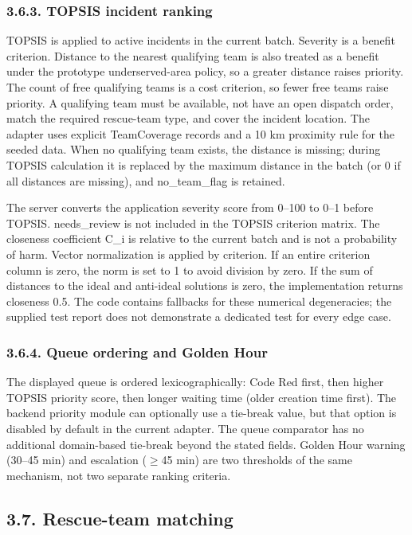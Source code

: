 \documentclass[pdflatex,sn-mathphys-ay]{sn-jnl}
\begin{document}
\subsubsection*{3.6.3. TOPSIS incident ranking}

TOPSIS is applied to active incidents in the current batch. Severity is a benefit criterion. Distance to the nearest qualifying team is also treated as a benefit under the prototype underserved-area policy, so a greater distance raises priority. The count of free qualifying teams is a cost criterion, so fewer free teams raise priority. A qualifying team must be available, not have an open dispatch order, match the required rescue-team type, and cover the incident location. The adapter uses explicit TeamCoverage records and a 10 km proximity rule for the seeded data. When no qualifying team exists, the distance is missing; during TOPSIS calculation it is replaced by the maximum distance in the batch (or 0 if all distances are missing), and no\_team\_flag is retained.

The server converts the application severity score from 0--100 to 0--1 before TOPSIS. needs\_review is not included in the TOPSIS criterion matrix. The closeness coefficient C\_i is relative to the current batch and is not a probability of harm. Vector normalization is applied by criterion. If an entire criterion column is zero, the norm is set to 1 to avoid division by zero. If the sum of distances to the ideal and anti-ideal solutions is zero, the implementation returns closeness 0.5. The code contains fallbacks for these numerical degeneracies; the supplied test report does not demonstrate a dedicated test for every edge case.

\subsubsection*{3.6.4. Queue ordering and Golden Hour}

The displayed queue is ordered lexicographically: Code Red first, then higher TOPSIS priority score, then longer waiting time (older creation time first). The backend priority module can optionally use a tie-break value, but that option is disabled by default in the current adapter. The queue comparator has no additional domain-based tie-break beyond the stated fields. Golden Hour warning (30--45 min) and escalation ($\geq$45 min) are two thresholds of the same mechanism, not two separate ranking criteria.

\subsection*{3.7. Rescue-team matching}
\end{document}

